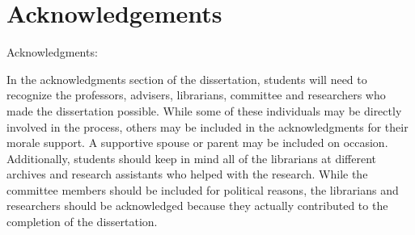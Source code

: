 \chapter*{Acknowledgements}

Acknowledgments:

In the acknowledgments section of the dissertation, students will need to recognize the professors, advisers, librarians, committee and researchers who made the dissertation possible. While some of these individuals may be directly involved in the process, others may be included in the acknowledgments for their morale support. A supportive spouse or parent may be included on occasion. Additionally, students should keep in mind all of the librarians at different archives and research assistants who helped with the research. While the committee members should be included for political reasons, the librarians and researchers should be acknowledged because they actually contributed to the completion of the dissertation.

